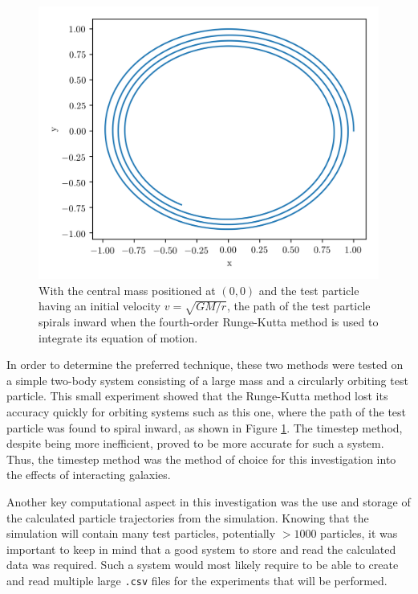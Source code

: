 \documentclass[twoside,twocolumn]{article}
\begin{document}
    \begin{figure}
        \centering
        \includegraphics[width=\linewidth]{images/RK45.png}
        \caption{With the central mass positioned at $(0, 0)$ and the test particle having an initial velocity $v = \sqrt{GM/r}$, the path of the test particle spirals inward when the fourth-order Runge-Kutta method is used to integrate its equation of motion.}
        \label{figure:RK45}
        
    \end{figure}

    In order to determine the preferred technique, these two methods were tested on a simple two-body system consisting of a large mass and a circularly orbiting test particle. This small experiment showed that the Runge-Kutta method lost its accuracy quickly for orbiting systems such as this one, where the path of the test particle was found to spiral inward, as shown in Figure \ref{figure:RK45}. The timestep method, despite being more inefficient, proved to be more accurate for such a system. Thus, the timestep method was the method of choice for this investigation into the effects of interacting galaxies.

    Another key computational aspect in this investigation was the use and storage of the calculated particle trajectories from the simulation. Knowing that the simulation will contain many test particles, potentially $>1000$ particles, it was important to keep in mind that a good system to store and read the calculated data was required. Such a system would most likely require to be able to create and read multiple large \texttt{.csv} files for the experiments that will be performed. 
    
\end{document}
